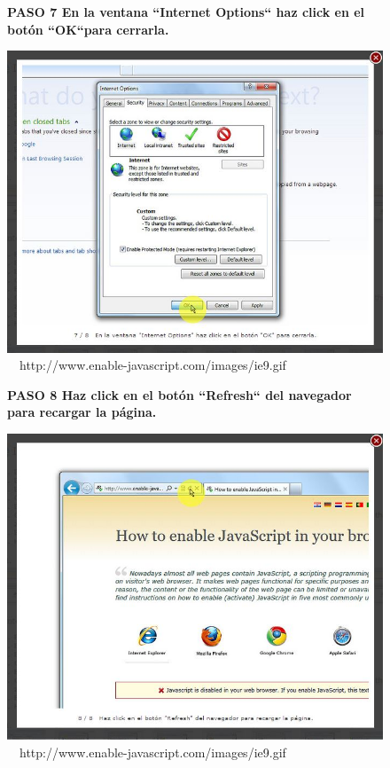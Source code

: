\documentclass[11pt]{article} %
\begin{document}
\begin{figure}
\begin{center}

\begin{center}
\bf PASO 7
En la ventana ``Internet Options`` haz click en el botón ``OK``para cerrarla.
\end{center}
\includegraphics[height=8 cm, width=8 cm] {imagenes/explorer 07.JPG}
\newline
\newline
\ 
\ {http://www.enable-javascript.com/images/ie9.gif }

\begin{center}
\bf PASO 8
Haz click en el botón ``Refresh`` del navegador para recargar la página.
\end{center}

\includegraphics[height=8 cm, width=8 cm] {imagenes/explorer 08.JPG}
\newline
\newline
\ 
\ {http://www.enable-javascript.com/images/ie9.gif }

\end{center}
\end{figure}
\end{document}
